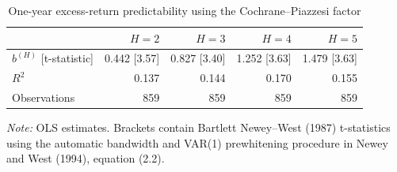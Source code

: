 \begin{table}[htbp]
\centering
\caption{One-year excess-return predictability using the Cochrane--Piazzesi factor}
\label{tab:q4e}
\begin{tabular}{lrrrr}
\toprule
 & $H=2$ & $H=3$ & $H=4$ & $H=5$ \\
\midrule
$b^{(H)}$ [t-statistic] & 0.442 [3.57] & 0.827 [3.40] & 1.252 [3.63] & 1.479 [3.63] \\
$R^2$ & 0.137 & 0.144 & 0.170 & 0.155 \\
Observations & 859 & 859 & 859 & 859 \\
\bottomrule
\end{tabular}
\begin{minipage}{0.92\textwidth}
\footnotesize\textit{Note:} OLS estimates. Brackets contain Bartlett Newey--West (1987) t-statistics using the automatic bandwidth and VAR(1) prewhitening procedure in Newey and West (1994), equation (2.2).
\end{minipage}
\end{table}
